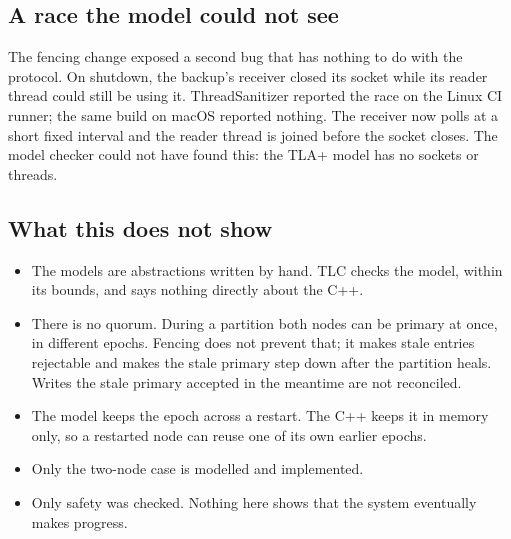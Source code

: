 

\subsection{A race the model could not see}
The fencing change exposed a second bug that has nothing to do with the protocol. On shutdown, the backup's receiver closed its socket while its reader thread could still be using it. ThreadSanitizer reported the race on the Linux CI runner; the same build on macOS reported nothing. The receiver now polls at a short fixed interval and the reader thread is joined before the socket closes. The model checker could not have found this: the TLA+ model has no sockets or threads.

\subsection{What this does not show}
\begin{itemize}
\item The models are abstractions written by hand. TLC checks the model, within its bounds, and says nothing directly about the C++.
\item There is no quorum. During a partition both nodes can be primary at once, in different epochs. Fencing does not prevent that; it makes stale entries rejectable and makes the stale primary step down after the partition heals. Writes the stale primary accepted in the meantime are not reconciled.
\item The model keeps the epoch across a restart. The C++ keeps it in memory only, so a restarted node can reuse one of its own earlier epochs.
\item Only the two-node case is modelled and implemented.
\item Only safety was checked. Nothing here shows that the system eventually makes progress.
\end{itemize}
